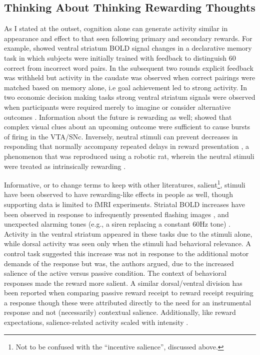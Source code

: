 \documentclass[doc,12pt]{apa}        %
\begin{document}
\subsection{Thinking About Thinking Rewarding Thoughts}
\label{sub:cogrew}
As I stated at the outset, cognition alone can generate activity similar in appearance and effect to that seen following primary and secondary rewards.  For example,  showed ventral striatum BOLD signal changes in a declarative memory task in which subjects were initially trained with feedback to distinguish 60 correct from incorrect word pairs.  In the subsequent two rounds explicit feedback was withheld but activity in the caudate was observed when correct pairings were matched based on memory alone, i.e goal achievement led to strong activity.  In two economic decision making tasks strong ventral striatum signals were observed when participants were required merely to imagine or consider alternative outcomes  \cite{Hayden:2009p6545, Lohrenz:2007p7240}.  Information about the future is rewarding as well;  showed that complex visual clues about an upcoming outcome were sufficient to cause bursts of firing in the VTA/SNc.  Inversely, neutral stimuli can prevent decreases in responding that normally accompany repeated delays in reward presentation \cite{Reed:1992p9094}, a phenomenon that was reproduced using a robotic rat, wherein the neutral stimuli were treated as intrinsically rewarding \cite{Fiore:2008p7249}.

Informative, or to change terms to keep with other literatures, salient\footnote{
    Not to be confused with the ``incentive salience'', discussed above.
}, stimuli have been observed to have rewarding-like effects in people as well, though supporting data is limited to fMRI experiments.  Striatal BOLD increases have been observed in response to infrequently presented flashing images \cite{Zink:2003p5107}, and unexpected alarming tones (e.g., a siren replacing a constant 60Hz tone) \cite{Zink:2006p7210}.  Activity in the ventral striatum appeared in these tasks due to the stimuli alone, while dorsal activity was seen only when the stimuli had behavioral relevance.  A control task suggested this increase was not in response to the additional motor demands of the response but was, the authors argued, due to the increased salience of the active versus passive condition.  The context of behavioral responses made the reward more salient.  A similar dorsal/ventral division has been reported when comparing passive reward receipt to reward receipt requiring a response \cite{ODoherty:2006p2875} though these were attributed directly to the need for an instrumental response and not (necessarily) contextual salience.  Additionally, like reward expectations, salience-related activity scaled with intensity \cite{Zink:2006p7210}.
\end{document}
